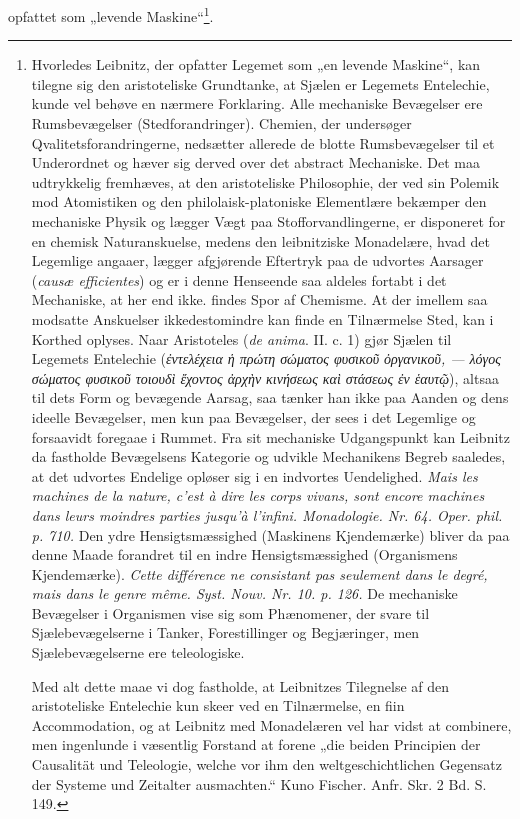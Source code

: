 \documentclass[12pt,a4paper]{book}
\begin{document}
opfattet som „levende Maskine“\footnote{Hvorledes Leibnitz, der opfatter Legemet
som „en levende Maskine“, kan tilegne sig den aristoteliske Grundtanke, at
Sjælen er Legemets Entelechie, kunde vel behøve en nærmere Forklaring. Alle
mechaniske Bevægelser ere Rumsbevægelser (Stedforandringer). Chemien, der
undersøger Qvalitetsforandringerne, nedsætter allerede de blotte Rumsbevægelser
til et Underordnet og hæver sig derved over det abstract Mechaniske. Det maa
udtrykkelig fremhæves, at den aristoteliske Philosophie, der ved sin Polemik mod
Atomistiken og den philolaisk-platoniske Elementlære bekæmper den mechaniske
Physik og lægger Vægt paa Stofforvandlingerne, er disponeret for en chemisk
Naturanskuelse, medens den leibnitziske Monadelære, hvad det Legemlige angaaer,
lægger afgjørende Eftertryk paa de udvortes Aarsager (\textit{causæ efficientes})
og er i denne Henseende saa aldeles fortabt i det Mechaniske, at her end ikke.
findes Spor af Chemisme. At der imellem saa modsatte Anskuelser ikkedestomindre
kan finde en Tilnærmelse Sted, kan i Korthed oplyses. Naar Aristoteles
(\textit{de anima}. II. c. 1) gjør Sjælen til Legemets Entelechie
(\textit{ἐντελέχεια ἡ πρώτη σώματος φυσικοῦ ὀργανικοῦ, --- λόγος σώματος φυσικοῦ
τοιουδὶ ἔχοντος ἀρχὴν κινήσεως καὶ στάσεως ἐν ἑαυτῷ}), altsaa til dets Form og
bevægende Aarsag, saa tænker han ikke paa Aanden og dens ideelle Bevægelser, men
kun paa Bevægelser, der sees i det Legemlige og forsaavidt foregaae i Rummet.
Fra sit mechaniske Udgangspunkt kan Leibnitz da fastholde Bevægelsens Kategorie
og udvikle Mechanikens Begreb saaledes, at det udvortes Endelige opløser sig i en
indvortes Uendelighed. \textit{Mais les machines de la nature, c'est à dire les
corps vivans, sont encore machines dans leurs moindres parties jusqu'à l'infini.
Monadologie. Nr. 64. Oper. phil. p. 710.} Den ydre Hensigtsmæssighed (Maskinens
Kjendemærke) bliver da paa denne Maade forandret til en indre Hensigtsmæssighed
(Organismens Kjendemærke). \textit{Cette différence ne consistant pas seulement
dans le degré, mais dans le genre même. Syst. Nouv. Nr. 10. p. 126.} De
mechaniske Bevægelser i Organismen vise sig som Phænomener, der svare til
Sjælebevægelserne i Tanker, Forestillinger og Begjæringer, men Sjælebevægelserne
ere teleologiske.\par
Med alt dette maae vi dog fastholde, at Leibnitzes Tilegnelse af den aristoteliske
Entelechie kun skeer ved en Tilnærmelse, en fiin Accommodation, og at Leibnitz
med Monadelæren vel har vidst at combinere, men ingenlunde i væsentlig Forstand
at forene „die beiden Principien der Causalität und Teleologie, welche vor ihm
den weltgeschichtlichen Gegensatz der Systeme und Zeitalter ausmachten.“ Kuno
Fischer. Anfr. Skr. 2 Bd. S. 149.}.
\end{document}
